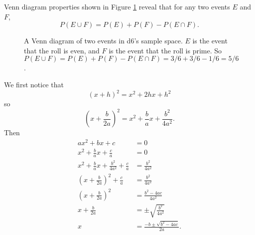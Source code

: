\documentclass{book}
\begin{document}
\begin{exercise*}[\ref{q:cup}]
Venn diagram properties shown in Figure \ref{vennd} reveal that for any two events $E$ and $F$, \[P(E \cup F) = P(E) + P(F) - P(E \cap F).\]
\begin{figure}[ht]
\centering
{}
\caption{A Venn diagram of two events in d6's sample space. $E$ is the event that the roll is even, and $F$ is the event that the roll is prime. So $P(E \cup F) = P(E) + P(F) - P(E \cap F) = 3/6 + 3/6 - 1/6 = 5/6$.}
\label{vennd}
\end{figure}
\end{exercise*}

\begin{exercise*}[{\ref{completesquare}}] We first notice that
\[(x + h)^2 = x^2 + 2hx + h^2\] so \[\left(x + \frac{b}{2a}\right)^2 = x^2 + \frac{b}{a}x + \frac{b^2}{4a^2}.\] Then
\begin{align*}
ax^2 + bx + c &= 0\\
x^2 + \frac{b}{a}x + \frac{c}{a} &= 0\\
x^2 + \frac{b}{a}x + \frac{b^2}{4a^2} + \frac{c}{a} &= \frac{b^2}{4a^2}\\
\left(x + \frac{b}{2a}\right)^2 + \frac{c}{a} &= \frac{b^2}{4a^2}\\
\left(x + \frac{b}{2a}\right)^2 &= \frac{b^2-4ac}{4a^2}\\
x + \frac{b}{2a} &= \pm\sqrt{\frac{b^2}{4a^2}}\\
x &= \frac{-b \pm \sqrt{b^2 - 4ac}}{2a}.
\end{align*}
\end{exercise*}
\end{document}
